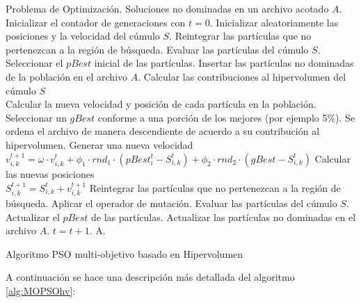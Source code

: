 \begin{algorithm}
\begin{algorithmic}[1]
	\REQUIRE Problema de Optimizaci\'on.
	\ENSURE Soluciones no dominadas en un archivo acotado $A$.	  
	  \STATE Inicializar el contador de generaciones con $t=0$.
	  \STATE Inicializar aleatoriamente las posiciones y la velocidad del c\'umulo $S$.
	  \STATE Reintegrar las part\'iculas que no pertenezcan a la regi\'on de b\'usqueda.
	  \STATE Evaluar las part\'iculas del c\'umulo $S$.
	  \STATE Seleccionar el $pBest$ inicial de las part\'iculas.  
	  \STATE Insertar las part\'iculas no dominadas de la poblaci\'on en el archivo $A$.
	  \STATE Calcular las contribuciones al hipervolumen del c\'umulo $S$
	  \\ Calcular la nueva velocidad y posici\'on de cada part\'icula en la poblaci\'on.
	     \STATE Seleccionar un $gBest$ conforme a una porci\'on de los mejores (por ejemplo 5\%). Se ordena el archivo
	     de manera descendiente de acuerdo a su contribuci\'on al hipervolumen.
	     \STATE Generar una nueva velocidad 
		\\  $v^{t+1}_{i,k} = \omega \cdot v^t_{i,k} + \phi_1 \cdot rnd_1 \cdot \left(pBest^t_i - S^t_{i,k} \right) 
					    + \phi_2 \cdot rnd_2 \cdot \left(gBest - S^t_{i,k} \right)$
	      \STATE Calcular las nuevas posiciones 
		\\$S^{t+1}_{i,k}=S^{t}_{i,k}+v^{t+1}_{i,k}$
	     \ENDFOR
		\STATE Reintegrar las part\'iculas que no pertenezcan a la regi\'on de b\'usqueda.
		\STATE Aplicar el operador de mutaci\'on.
		\STATE Evaluar las part\'iculas del c\'umulo $S$.
		\STATE Actualizar el $pBest$ de las part\'iculas.  
		\STATE Actualizar las part\'iculas no dominadas en el archivo $A$.	
		\STATE $t=t+1$.
	\ENDWHILE
	\RETURN A.
	\end{algorithmic}
	\caption{Algoritmo PSO multi-objetivo basado en Hipervolumen}
	\label{alg:MOPSOhv}
	\end{algorithm}

A continuaci\'on se hace una descripci\'on m\'as detallada del algoritmo \ref{alg:MOPSOhv}:
	
